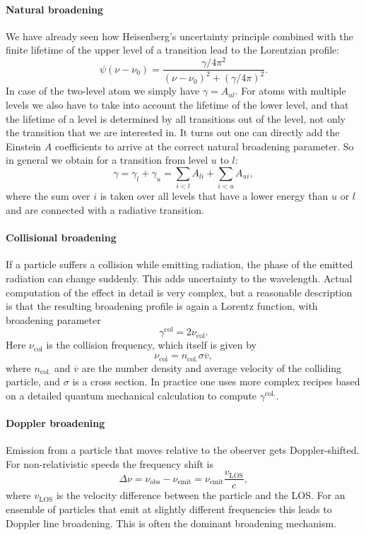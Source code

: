\documentclass[12pt]{article}
\numberwithin{equation}{section}
\newcommand{\be}{\begin{equation}}
\newcommand{\ee}{\end{equation}}
\begin{document}
\paragraph{Natural  broadening} We have already seen how Heisenberg's uncertainty principle combined with the finite lifetime of the upper level of a transition lead to the Lorentzian profile:
\be
\psi(\nu-\nu_0) = \frac{\gamma / 4 \pi^2}{(\nu-\nu_0)^2 + (\gamma /4 \pi)^2}.
\ee
In case of the two-level atom we simply have $\gamma=A_{ul}$. For atoms with multiple levels we also have to take into account the lifetime of the lower level, and that the lifetime of a level is determined by all transitions out of the level, not only the transition that we are interested in. It turns out one can directly add the Einstein $A$ coefficients to arrive at the correct natural broadening parameter. So in general we obtain for a transition from level $u$ to  $l$:
\be
\gamma = \gamma_l + \gamma_u = \sum_{i<l} A_{li} + \sum_{i<u} A_{ui},
\ee 
where the sum over $i$ is taken over all levels that have a lower energy than $u$ or $l$ and are connected with a radiative transition.

\paragraph{Collisional broadening}
If a particle suffers a collision while emitting radiation, the phase of the emitted radiation can change suddenly. This adds uncertainty to the wavelength. Actual computation of the effect in detail is very complex, but a reasonable description is that the resulting broadening profile is again a Lorentz function, with broadening parameter
\be
\gamma^\mathrm{col} =2 \nu_\mathrm{col}.
\ee
Here $\nu_\mathrm{col}$ is the collision frequency, which itself is given by 
\be
\nu_\mathrm{col}= n_\mathrm{col.} \sigma \overline{v},
\ee
where $n_\mathrm{col.}$ and $\overline{v}$ are the number density and average velocity of the colliding particle, and $\sigma$ is a cross section.  In practice one uses more complex recipes based on a detailed quantum mechanical calculation to compute $\gamma^\mathrm{col.}$.

\paragraph{Doppler broadening} Emission from a particle that moves relative to the observer gets Doppler-shifted. For non-relativistic speeds the frequency shift is
\be
\Delta \nu = \nu_\mathrm{obs} - \nu_\mathrm{emit} = \nu_\mathrm{emit} \frac{v_\mathrm{LOS}}{c},
\ee
where $v_\mathrm{LOS}$ is the velocity difference between the particle and the LOS. For an ensemble of particles that emit at slightly different frequencies this leads to Doppler line broadening. This is often the dominant broadening mechanism.
\end{document}
